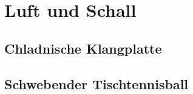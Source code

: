 \newpage
\chapter{Luft und Schall}

\section{Chladnische Klangplatte}

\section{Schwebender Tischtennisball}
